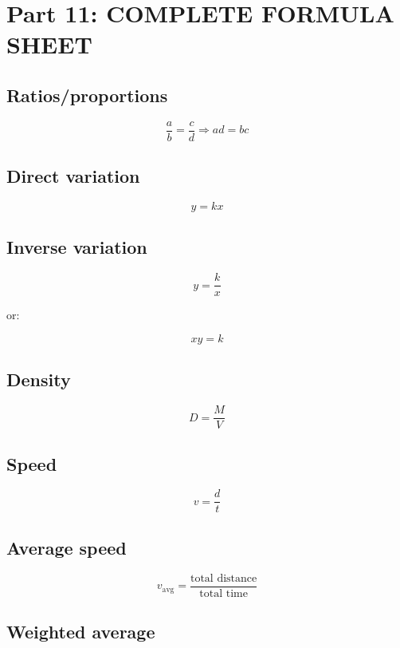 \documentclass[
]{article}
\begin{document}
\section{Part 11: COMPLETE FORMULA
SHEET}\label{part-11-complete-formula-sheet}

\subsection{Ratios/proportions}\label{ratiosproportions}

\[
\boxed{\frac ab=\frac cd\Rightarrow ad=bc}
\]

\subsection{Direct variation}\label{direct-variation-1}

\[
\boxed{y=kx}
\]

\subsection{Inverse variation}\label{inverse-variation-1}

\[
\boxed{y=\frac{k}{x}}
\]

or:

\[
\boxed{xy=k}
\]

\subsection{Density}\label{density-1}

\[
\boxed{D=\frac MV}
\]

\subsection{Speed}\label{speed}

\[
\boxed{v=\frac dt}
\]

\subsection{Average speed}\label{average-speed-1}

\[
\boxed{
v_{\text{avg}}
=
\frac{\text{total distance}}
{\text{total time}}
}
\]

\subsection{Weighted average}\label{weighted-average-1}
\end{document}
